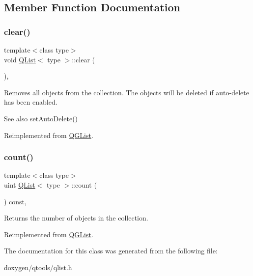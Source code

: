 \subsection{Member Function Documentation}
\mbox{\label{class_q_list_a3cc1e3b2eb4a0db55eb5a594bd67d059}} 
\subsubsection{\texorpdfstring{clear()}{clear()}}
{\footnotesize\ttfamily template$<$class type$>$ \\
void \mbox{\hyperlink{class_q_list}{Q\+List}}$<$ type $>$\+::clear (\begin{DoxyParamCaption}{ }\end{DoxyParamCaption})\hspace{0.3cm}{\ttfamily [inline]}, {\ttfamily [virtual]}}

Removes all objects from the collection. The objects will be deleted if auto-\/delete has been enabled. \begin{DoxySeeAlso}{See also}
set\+Auto\+Delete() 
\end{DoxySeeAlso}


Reimplemented from \mbox{\hyperlink{class_q_g_list_a9b89540497bfcf674466dcf9e343d981}{Q\+G\+List}}.

\mbox{\label{class_q_list_a1b95250082189972f4b499a529920180}} 
\subsubsection{\texorpdfstring{count()}{count()}}
{\footnotesize\ttfamily template$<$class type$>$ \\
uint \mbox{\hyperlink{class_q_list}{Q\+List}}$<$ type $>$\+::count (\begin{DoxyParamCaption}{ }\end{DoxyParamCaption}) const\hspace{0.3cm}{\ttfamily [inline]}, {\ttfamily [virtual]}}

Returns the number of objects in the collection. 

Reimplemented from \mbox{\hyperlink{class_q_g_list_af765260057e85e575adff7fd9f25d062}{Q\+G\+List}}.



The documentation for this class was generated from the following file\+:\begin{DoxyCompactItemize}
\item 
doxygen/qtools/qlist.\+h\end{DoxyCompactItemize}
